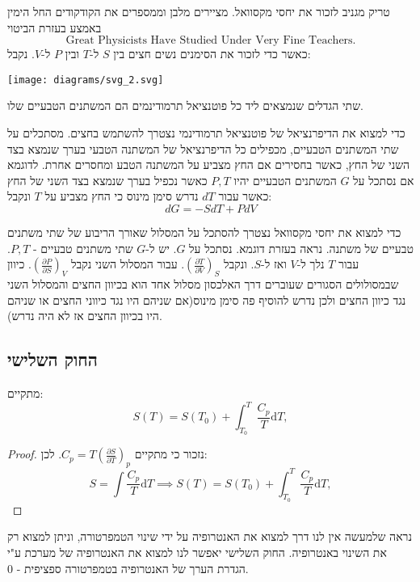 \documentclass{tstextbook}
\begin{document}
טריק מגניב לזכור את יחסי מקסוואל. מציירים מלבן וממספרים את הקודקודים החל הימין באמצע בעזרת הביטוי
$$\text{Great Physicists Have Studied Under Very Fine Teachers.}$$
כאשר כדי לזכור את הסימנים נשים חצים בין \(S\) ל-\(T\) ובין \(P\) ל-\(V\). נקבל:

\texttt{[image: diagrams/svg\_2.svg]}
\begin{proposition}
שתי הגדלים שנמצאים ליד כל פוטנציאל תרמודינמים הם המשתנים הטבעיים שלו.

\end{proposition}
\begin{proposition}
כדי למצוא את הדיפרנציאל של פוטנציאל תרמודינמי נצטרך להשתמש בחצים. מסתכלים על שתי המשתנים הטבעיים, מכפילים כל הדיפרנציאל של המשתנה הטבעי בערך שנמצא בצד השני של החץ, כאשר בחסירים אם החץ מצביע על המשתנה הטבע ומחסרים אחרת. לדוגמא אם נסתכל על \(G\) המשתנים הטבעיים יהיו \(P,T\) כאשר נכפיל בערך שנמצא בצד השני של החץ כאשר עבור \(dT\) נדרש סימן מינוס כי החץ מצביע על \(T\) ונקבל:
$$dG=-SdT+PdV$$

\end{proposition}
\begin{proposition}
כדי למצוא את יחסי מקסוואל נצטרך להסתכל על המסלול שאורך הריבוע של שתי משתנים טבעיים של משתנה. נראה בעזרת דוגמא. נסתכל על \(G\). יש ל-\(G\) שתי משתנים טבעיים - \(P,T\). עבור \(T\) נלך ל-\(V\) ואז ל-\(S\). ונקבל \(\left( \frac{\partial T}{\partial V} \right)_{S}\). עבור המסלול השני נקבל \(\left( \frac{\partial P}{\partial S} \right)_{V}\). כיוון שבמסולולים הסגורים שעוברים דרך האלכסון מסלול אחד הוא בכיוון החצים והמסלול השני נגד כיוון החצים ולכן נדרש להוסיף פה סימן מינוס(אם שניהם היו נגד כיווני החצים או שניהם היו בכיוון החצים אז לא היה נדרש).

\end{proposition}
\subsection{החוק השלישי}

\begin{proposition}
מתקיים:
$$S(T)=S(T_{0})+\int_{T_{0}}^{T}{\frac{C_{p}}{T}}\mathrm{d}T,$$

\end{proposition}
\begin{proof}
נזכור כי מתקיים \(C_{p}=T\left({\frac{\partial S}{\partial T}}\right)_{p}\). לכן:
$$S=\int{\frac{C_{p}}{T}}\mathrm{d}T\implies S(T)=S(T_{0})+\int_{T_{0}}^{T}{\frac{C_{p}}{T}}\mathrm{d}T,$$

\end{proof}
נראה שלמעשה אין לנו דרך למצוא את האנטרופיה על ידי שינוי הטמפרטורה, וניתן למצוא רק את השינוי באנטרופיה. החוק השלישי יאפשר לנו למצוא את האנטרופיה של מערכת ע"י הגדרת הערך של האנטרופיה בטמפרטורה ספציפית - 0.
\end{document}
